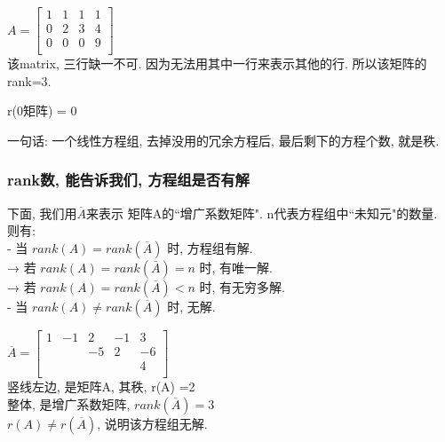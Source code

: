 \documentclass[UTF8]{ctexart}
\begin{document}
\begin{myEnvSample}
$A=\left[ \begin{matrix}
	1&		1&		1&		1\\
	0&		2&		3&		4\\
	0&		0&		0&		9\\
\end{matrix} \right]$\\

该matrix, 三行缺一不可. 因为无法用其中一行来表示其他的行. 所以该矩阵的 rank=3.
\end{myEnvSample}


\begin{myEnvSample}
r(0矩阵) = 0
\end{myEnvSample}

一句话: 一个线性方程组, 去掉没用的冗余方程后, 最后剩下的方程个数, 就是秩.



\subsubsection{rank数, 能告诉我们, 方程组是否有解}

下面, 我们用$\overline{A} $来表示 矩阵A的``增广系数矩阵". n代表方程组中``未知元"的数量.\\

则有:\\
- 当 $ rank(A) = rank(\overline{A})$ 时, 方程组有解. \\
→ 若 $ rank(A) = rank(\overline{A}) = n$ 时, 有唯一解. \\
→ 若 $ rank(A) = rank(\overline{A}) < n$ 时, 有无穷多解. \\

- 当 $ rank(A) \ne rank(\overline{A})$ 时, 无解.\\


\begin{myEnvSample}
$\overline{A}=\left[ \begin{array}{cccc|c}
	1&		-1&		2&		-1&		3\\
	&		&		-5&		2&		-6\\
	&		&		&		&		4\\
\end{array} \right]$\\

竖线左边, 是矩阵A, 其秩, r(A) =2 \\
整体, 是增广系数矩阵, $rank(\overline{A}) = 3 $\\
$r(A) \ne  r(\overline{A}) $, 说明该方程组无解.
\end{myEnvSample}
\end{document}
